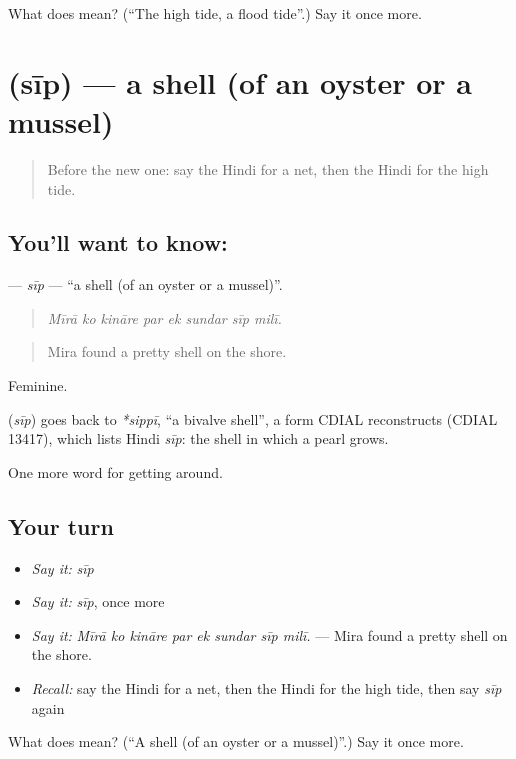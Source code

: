 \begin{tcolorbox}[breakable,colback=teal!4,colframe=teal!35!black,title={Before you move on}]
What does  mean? (\textquotedblleft{}The high tide, a flood tide\textquotedblright{}.) Say it once more.
\end{tcolorbox}
\section[\texorpdfstring{\hi{सीप} (sīp)}{सीप (sīp)}]{ (sīp) — a shell (of an oyster or a mussel)}

\label{lesson:HI-C445-sip}



\begin{quote}
Before the new one: say the Hindi for a net, then the Hindi for the high tide.
\end{quote}

\subsection*{You'll want to know: }
\textbf{} — \emph{sīp} — \textquotedblleft{}a shell (of an oyster or a mussel)\textquotedblright{}.

\begin{quote}
       
\end{quote}

\begin{quote}
\emph{Mīrā ko kināre par ek sundar sīp milī.}
\end{quote}

\begin{quote}
Mira found a pretty shell on the shore.
\end{quote}

Feminine.

\begin{cousinweb}
\textbf{} (\emph{sīp}) goes back to \emph{*sippī}, \textquotedblleft{}a bivalve shell\textquotedblright{}, a form CDIAL reconstructs (CDIAL 13417), which lists Hindi \emph{sīp}: the shell in which a pearl grows.
\end{cousinweb}

\begin{grammarlens}[title={What you've built}]
One more word for getting around.
\end{grammarlens}

\subsection*{Your turn}
\begin{itemize}
\raggedright
  \item \emph{Say it:} \emph{sīp}
  \item \emph{Say it:} \emph{sīp}, once more
  \item \emph{Say it:} \emph{Mīrā ko kināre par ek sundar sīp milī.} — Mira found a pretty shell on the shore.
  \item \emph{Recall:} say the Hindi for a net, then the Hindi for the high tide, then say \emph{sīp} again
\end{itemize}

\begin{tcolorbox}[breakable,colback=teal!4,colframe=teal!35!black,title={Before you move on}]
What does  mean? (\textquotedblleft{}A shell (of an oyster or a mussel)\textquotedblright{}.) Say it once more.
\end{tcolorbox}
